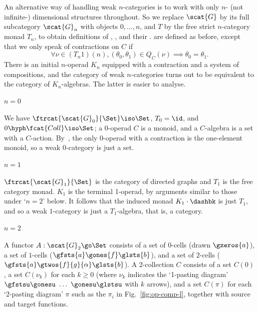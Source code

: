 \clearpage





An alternative way of handling weak $n$-categories is to work with only $n$-
(not infinite-) dimensional structures throughout.  So we replace $\scat{G}$
by its full subcategory $\scat{G}_n$ with objects $0, \ldots, n$, and $T$ by
the free strict $n$-category monad $T_n$, to obtain definitions of
, , and their .
 are defined as before, except that we only speak of
contractions on $C$ if
%
\begin{equation}	\label{eq:n-contr-b}
\forall \nu \in (T_n 1)(n), (\theta_0, \theta_1) \in Q_C(\nu)
\implies 
\theta_0 = \theta_1.
\end{equation}
%
There is an initial $n$-operad $K_n$ equipped with a contraction and a system
of compositions, and the category of weak $n$-categories turns out to be
equivalent to the category of $K_n$-algebras.  The latter is easier to
analyse.

\paragraph{$n=0$} 

We have $\ftrcat{\scat{G}_0}{\Set} \iso \Set$, $T_0 = \id$, and
$0\hyph\fcat{Coll} \iso \Set$; a 0-operad $C$ is a monoid, and a $C$-algebra
is a set with a $C$-action.  By~, the only 0-operad with a
contraction is the one-element monoid, so a weak $0$-category is just a set.

\paragraph{$n=1$}

$\ftrcat{\scat{G}_1}{\Set}$ is the category of directed graphs and $T_1$ is
the free category monad.  $K_1$ is the terminal 1-operad, by arguments
similar to those under `$n=2$' below.  It follows that the induced monad $K_1
\cdot \dashbk$ is just $T_1$, and so a weak $1$-category is just a
$T_1$-algebra, that is, a category.

\paragraph{$n=2$} 

A functor $A: \scat{G}_2 \go \Set$ consists of a set of $0$-cells (drawn
$\gzeros{a}$), a set of $1$-cells ($\gfsts{a}\gones{f}\glsts{b}$), and a set
of $2$-cells ($\gfsts{a}\gtwos{f}{g}{\alpha}\glsts{b}$).  A 2-collection $C$
consists of a set $C(0)$, a set $C(\nu_k)$ for each $k\geq 0$ (where $\nu_k$
indicates the `1-pasting diagram' $\gfstsu\gonesu\ \ldots\ \gonesu\glstsu$
with $k$ arrows), and a set $C(\pi)$ for each `2-pasting diagram' $\pi$ such
as the $\pi_i$ in Fig.~\ref{fig:op-comp-l}, together with source and target
functions.

